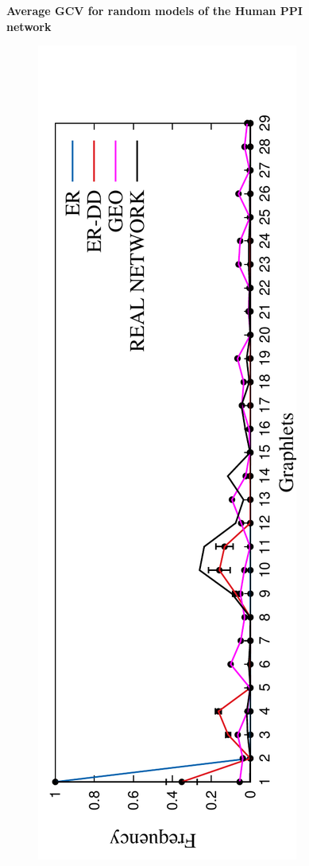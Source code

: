 \begin{figure}[H]
  \centering
  \textbf{Average GCV for random models of the Human PPI network}
  \begin{subfigure}[b]{1.0\textwidth}
    \includegraphics[angle=-90,scale=0.6]{../code/final_results/human_ppi/avg_egdvs_rnd_spreads_figures/spreads_012_rnd2.pdf} 

\end{subfigure}
\end{figure}
